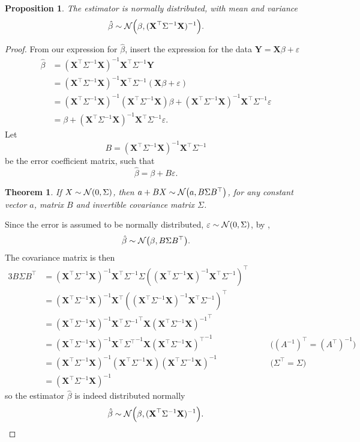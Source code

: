 \documentclass[letterpaper, reqno]{amsart}
\newtheorem{theorem}{Theorem}[section]
\newtheorem{prop}{Proposition}[section]
\numberwithin{equation}{section}
\newcommand{\T}{\top} %
\newcommand{\vect}[1]{\boldsymbol{\mathbf{#1}}} %
\newcommand{\N}[2]{\mathcal{N}\mleft( #1, #2 \mright)}
\newcommand{\by}[1]{&\quad&\text{(#1)}}
\newcommand{\Xm}{\vect{X}}
\newcommand{\Yv}{\vect{Y}}
\newcommand{\Bv}{\beta}
\newcommand{\Bvh}{\hat{\beta}}
\newcommand{\ve}{\varepsilon}
\begin{document}
\begin{prop} \label{prop:BvN}
  The estimator is normally distributed, with mean and variance
  \[ \Bvh \sim \N{\Bv}{(\Xm^\T \Sigma^{-1} \Xm)^{-1}}. \]
\end{prop}

\begin{proof}
  From our expression for $\Bvh$, insert the expression for the data $\Yv
  = \Xm\Bv + \ve$
  \begin{align*}
    \Bvh &= (\Xm^\T \Sigma^{-1} \Xm)^{-1} \Xm^\T \Sigma^{-1} \Yv \\
         &= (\Xm^\T \Sigma^{-1} \Xm)^{-1} \Xm^\T \Sigma^{-1} (\Xm\Bv + \ve) \\
         &= (\Xm^\T \Sigma^{-1} \Xm)^{-1} (\Xm^\T \Sigma^{-1} \Xm)\Bv 
          + (\Xm^\T \Sigma^{-1} \Xm)^{-1} \Xm^\T \Sigma^{-1} \ve \\
         &= \Bv + (\Xm^\T \Sigma^{-1} \Xm)^{-1} \Xm^\T \Sigma^{-1} \ve.
  \end{align*}
  Let
  \[ B = (\Xm^\T \Sigma^{-1} \Xm)^{-1} \Xm^\T \Sigma^{-1} \]
  be the error coefficient matrix, such that
  \[ \Bvh = \Bv + B\ve. \]

  \begin{theorem} \label{thm:Bx}
    If $X \sim \N{0}{\Sigma}$, then $a + BX \sim \N{a}{B \Sigma B^\T}$,
    for any constant vector $a$, matrix $B$ and invertible covariance matrix
    $\Sigma$.
  \end{theorem}

  Since the error is assumed to be normally distributed,
  $\ve \sim \N{0}{\Sigma}$, by ,
  \[ \Bvh \sim \N{\Bv}{B \Sigma B^\T}. \]
  The covariance matrix is then
  \begin{alignat*}{3}
    B \Sigma B^\T &= (\Xm^\T \Sigma^{-1} \Xm)^{-1} \Xm^\T \Sigma^{-1} \Sigma
                    ((\Xm^\T \Sigma^{-1} \Xm)^{-1} \Xm^\T \Sigma^{-1})^\T \\
                  &= (\Xm^\T \Sigma^{-1} \Xm)^{-1} \Xm^\T 
                    ((\Xm^\T \Sigma^{-1} \Xm)^{-1} \Xm^\T \Sigma^{-1})^\T \\
                  &= (\Xm^\T \Sigma^{-1} \Xm)^{-1} \Xm^\T 
                    {\Sigma^{-1}}^\T \Xm {(\Xm^\T \Sigma^{-1} \Xm)^{-1}}^\T \\
                  &= (\Xm^\T \Sigma^{-1} \Xm)^{-1} \Xm^\T 
                    {\Sigma^\T}^{-1} \Xm {(\Xm^\T \Sigma^{-1} \Xm)^\T}^{-1}
                    \by{${(A^{-1})}^\T = {(A^\T)}^{-1}$} \\
                  &= (\Xm^\T \Sigma^{-1} \Xm)^{-1} 
                     (\Xm^\T \Sigma^{-1} \Xm) (\Xm^\T \Sigma^{-1} \Xm)^{-1}
                    \by{$\Sigma^\T = \Sigma$} \\
                  &= (\Xm^\T \Sigma^{-1} \Xm)^{-1} 
  \end{alignat*}
  so the estimator $\Bvh$ is indeed distributed normally
  \[ \Bvh \sim \N{\Bv}{(\Xm^\T \Sigma^{-1} \Xm)^{-1}}. \qedhere \]
\end{proof}
\end{document}
